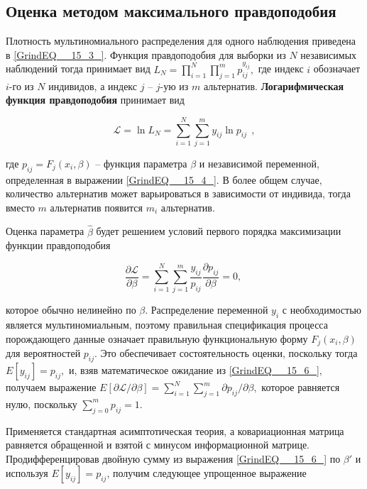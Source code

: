 \subsection{Оценка методом максимального правдоподобия}

Плотность мультиномиального распределения для одного наблюдения приведена в \eqref{GrindEQ__15_3_}. Функция правдоподобия для выборки из $N$ независимых наблюдений тогда принимает вид $L_N=\prod^N_{i=1}{\prod^m_{j=1}{p^{y_{ij}}_{ij}}},$ где индекс $i$ обозначает $i$-го из $N$ индивидов, а индекс $j$ -- $j$-ую из $m$ альтернатив. \textbf{Логарифмическая функция правдоподобия} принимает вид

\begin{equation} \label{GrindEQ__15_5_} {\mathcal L}={\ln  L_N=\sum^N_{i=1}{\sum^m_{j=1}{y_{ij}{\ln  p_{ij}\ }}}\ }, 
\end{equation} 

где $p_{ij}=F_j(x_i,\beta )$ -- функция параметра $\beta $ и независимой переменной, определенная в выражении \eqref{GrindEQ__15_4_}. В более общем случае, количество альтернатив может варьироваться в зависимости от индивида, тогда вместо $m$ альтернатив появится $m_i$ альтернатив.

Оценка параметра $\widehat{\beta }$ будет решением  условий первого порядка максимизации функции правдоподобия

\begin{equation} 
\label{GrindEQ__15_6_} 
\frac{\partial {\mathcal L}}{\partial\beta }=\sum^N_{i=1}{\sum^m_{j=1}{\frac{y_{ij}}{p_{ij}}}}\frac{\partial p_{ij}}{\partial\beta }=0,\  
\end{equation} 

которое обычно нелинейно по $\beta $. Распределение переменной $y_i$ с необходимостью является мультиномиальным, поэтому правильная спецификация процесса порождающего данные означает правильную функциональную форму $F_j(x_i,\beta )$ для вероятностей $p_{ij}$. Это обеспечивает состоятельность оценки, поскольку тогда $E\left[y_{ij}\right]=p_{ij},$ и, взяв математическое ожидание из \eqref{GrindEQ__15_6_}, получаем выражение $E\left[{\partial {\mathcal L}}/{\partial \beta }\right]=\sum^N_{i=1}{\sum^m_{j=1}{{\partial p_{ij}}/{\partial \beta }}},$ которое равняется нулю, поскольку $\sum^m_{j=0}{p_{ij}}=1.$

Применяется стандартная асимптотическая теория, а ковариационная матрица равняется обращенной и взятой с минусом информационной матрице. Продифференцировав двойную сумму из выражения \eqref{GrindEQ__15_6_} по $\beta '$ и используя $E\left[y_{ij}\right]=p_{ij}$, получим следующее упрощенное выражение

